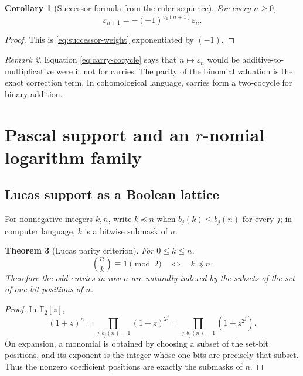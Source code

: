\documentclass[11pt,oneside]{article}
\newtheorem{theorem}{Theorem}[section]
\newtheorem{corollary}[theorem]{Corollary}
\theoremstyle{definition}
\theoremstyle{remark}
\newtheorem{remark}[theorem]{Remark}
\newcommand{\F}{\mathbb F}
\newcommand{\vtwo}{v_2}
\newcommand{\eps}{\varepsilon}
\newcommand{\submask}{\preccurlyeq}
\newcommand{\1}{\mathbf 1}
\begin{document}
\begin{corollary}[Successor formula from the ruler sequence]
\label{cor:successor-sign}
For every \(n\ge0\),
\begin{equation}
 \boxed{\eps_{n+1}=-(-1)^{\vtwo(n+1)}\eps_n.}
 \label{eq:successor-sign}
\end{equation}
\end{corollary}

\begin{proof}
This is \eqref{eq:successor-weight} exponentiated by \((-1)\).
\end{proof}

\begin{remark}
Equation \eqref{eq:carry-cocycle} says that \(n\mapsto\eps_n\) would be additive-to-
multiplicative were it not for carries.  The parity of the binomial valuation is the exact
correction term.  In cohomological language, carries form a two-cocycle for binary addition.
\end{remark}

\section{Pascal support and an \texorpdfstring{\(r\)}{r}-nomial logarithm family}
\label{sec:pascal}

\subsection{Lucas support as a Boolean lattice}

For nonnegative integers \(k,n\), write \(k\submask n\) when
\(b_j(k)\le b_j(n)\) for every \(j\); in computer language, \(k\) is a bitwise submask of
\(n\).

\begin{theorem}[Lucas parity criterion]
\label{thm:lucas-parity}
For \(0\le k\le n\),
\begin{equation}
 \binom nk\equiv1\pmod2
 \quad\Longleftrightarrow\quad
 k\submask n.
 \label{eq:lucas-submask}
\end{equation}
Therefore the odd entries in row \(n\) are naturally indexed by the subsets of the set of
one-bit positions of \(n\).
\end{theorem}

\begin{proof}
In \(\F_2[z]\),
\[
 (1+z)^n
 =\prod_{j:b_j(n)=1}(1+z)^{2^j}
 =\prod_{j:b_j(n)=1}(1+z^{2^j}).
\]
On expansion, a monomial is obtained by choosing a subset of the set-bit positions, and its
exponent is the integer whose one-bits are precisely that subset.  Thus the nonzero
coefficient positions are exactly the submasks of \(n\).
\end{proof}
\end{document}

